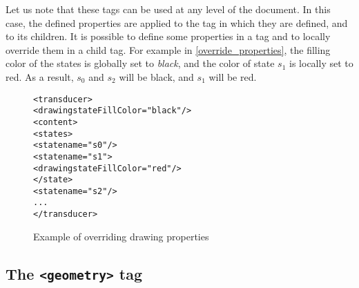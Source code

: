 \documentclass[a4paper]{article}
\newcommand{\xtag}[1]{\texttt{<#1>}}
\begin{document}
Let us note that these tags can be used at any level of the document.
In this case, the defined properties are applied to the tag in which
they are defined, and to its children. It is possible to define some
properties in a tag and to locally override them in a child tag. For
example in \autoref{override_properties}, the filling color of the
states is globally set to \textit{black}, and the color of state $s_1$
is locally set to red. As a result, $s_0$ and $s_2$ will be black, and
$s_1$ will be red.

\begin{figure}[htp]
  \small
  \begin{center}
\begin{alltt}
<transducer>
  <drawing stateFillColor="black"/>
  <content>
     <states>
        <state name="s0"/>
        <state name="s1">
            <drawing stateFillColor="red"/>
        </state>
        <state name="s2"/>
      ...
</transducer>
\end{alltt}

    \caption{Example of overriding drawing properties}
    \label{override_properties}
  \end{center}
\end{figure}

\subsection{The \xtag{geometry} tag}
\end{document}

